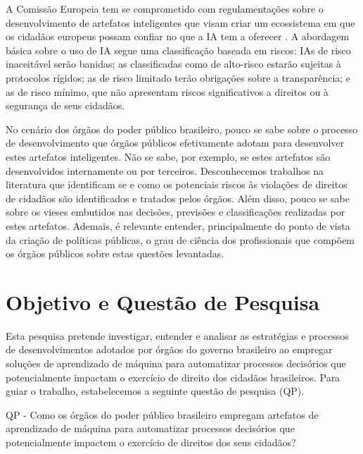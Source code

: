 \documentclass[12pt]{article}
\begin{document}
A Comissão Europeia tem se comprometido com regulamentações sobre o desenvolvimento de artefatos inteligentes que visam criar um ecossistema em que os cidadãos europeus possam confiar no que a IA tem a oferecer \cite{EC2020}. A abordagem básica sobre o uso de IA segue uma classificação baseada em riscos: IAs de risco inaceitável serão banidas; as classificadas como de alto-risco estarão sujeitas à protocolos rígidos; as de risco limitado terão obrigações sobre a transparência; e as de risco mínimo, que não apresentam riscos significativos a direitos ou à segurança de seus cidadãos.

No cenário dos órgãos do poder público brasileiro, pouco se sabe sobre o processo de desenvolvimento que órgãos públicos efetivamente adotam para desenvolver estes artefatos inteligentes. Não se sabe, por exemplo, se estes artefatos são desenvolvidos internamente ou por terceiros. Desconhecemos trabalhos na literatura que identificam se e como os potenciais riscos às violações de direitos de cidadãos são identificados e tratados pelos órgãos. Além disso, pouco se sabe sobre os vieses embutidos nas decisões, previsões e classificações realizadas por estes artefatos. Ademais, é relevante entender, principalmente do ponto de vista da criação de políticas públicas, o grau de ciência dos profissionais que compõem os órgãos públicos sobre estas questões levantadas.


\section{Objetivo e Questão de Pesquisa}

Esta pesquisa pretende investigar, entender e analisar as estratégias e processos de desenvolvimentos adotados por órgãos do governo brasileiro ao empregar soluções de aprendizado de máquina para automatizar processos decisórios que potencialmente impactam o exercício de direito dos cidadãos brasileiros. Para guiar o trabalho, estabelecemos a seguinte questão de pesquisa (QP).

\vspace{6pt}
\noindent
QP - Como os órgãos do poder público brasileiro empregam artefatos de aprendizado de máquina para automatizar processos decisórios que potencialmente impactem o exercício de direitos dos seus cidadãos?
\end{document}
